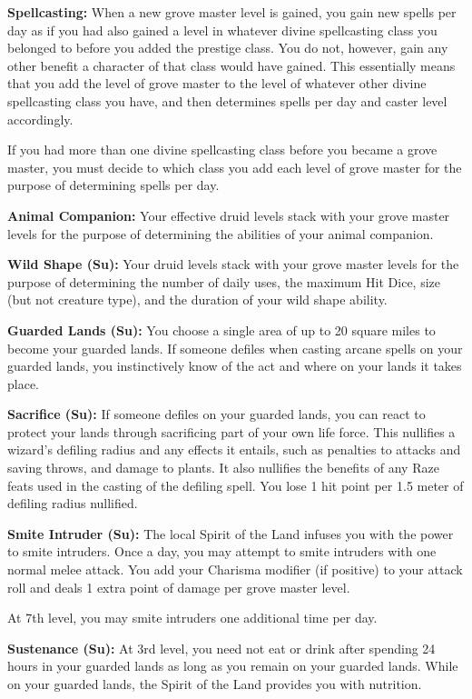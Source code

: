 {
\textbf{Spellcasting:} When a new grove master level is gained, you gain new spells per day as if you had also gained a level in whatever divine spellcasting class you belonged to before you added the prestige class. You do not, however, gain any other benefit a character of that class would have gained. This essentially means that you add the level of grove master to the level of whatever other divine spellcasting class you have, and then determines spells per day and caster level accordingly.

If you had more than one divine spellcasting class before you became a grove master, you must decide to which class you add each level of grove master for the purpose of determining spells per day.

\textbf{Animal Companion:} Your effective druid levels stack with your grove master levels for the purpose of determining the abilities of your animal companion.

\textbf{Wild Shape (Su):} Your druid levels stack with your grove master levels for the purpose of determining the number of daily uses, the maximum Hit Dice, size (but not creature type), and the duration of your wild shape ability.

\textbf{Guarded Lands (Su):} You choose a single area of up to 20 square miles to become your guarded lands. If someone defiles when casting arcane spells on your guarded lands, you instinctively know of the act and where on your lands it takes place.

\textbf{Sacrifice (Su):} If someone defiles on your guarded lands, you can react to protect your lands through sacrificing part of your own life force. This nullifies a wizard's defiling radius and any effects it entails, such as penalties to attacks and saving throws, and damage to plants. It also nullifies the benefits of any Raze feats used in the casting of the defiling spell. You lose 1 hit point per 1.5 meter of defiling radius nullified.

\textbf{Smite Intruder (Su):} The local Spirit of the Land infuses you with the power to smite intruders. Once a day, you may attempt to smite intruders with one normal melee attack. You add your Charisma modifier (if positive) to your attack roll and deals 1 extra point of damage per grove master level.

At 7th level, you may smite intruders one additional time per day.

\textbf{Sustenance (Su):} At 3rd level, you need not eat or drink after spending 24 hours in your guarded lands as long as you remain on your guarded lands. While on your guarded lands, the Spirit of the Land provides you with nutrition. 

}
